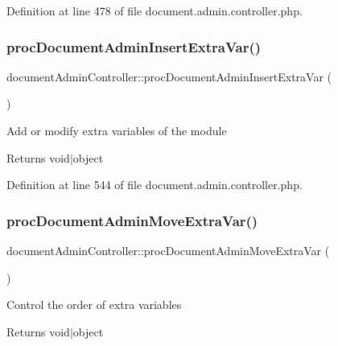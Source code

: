 Definition at line 478 of file document.\+admin.\+controller.\+php.

\hypertarget{classdocumentAdminController_a8f766283de71f7b22d325eb8dd8b4053}{}\label{classdocumentAdminController_a8f766283de71f7b22d325eb8dd8b4053} 
\subsubsection{\texorpdfstring{proc\+Document\+Admin\+Insert\+Extra\+Var()}{procDocumentAdminInsertExtraVar()}}
{\footnotesize\ttfamily document\+Admin\+Controller\+::proc\+Document\+Admin\+Insert\+Extra\+Var (\begin{DoxyParamCaption}{ }\end{DoxyParamCaption})}

Add or modify extra variables of the module \begin{DoxyReturn}{Returns}
void$\vert$object 
\end{DoxyReturn}


Definition at line 544 of file document.\+admin.\+controller.\+php.

\hypertarget{classdocumentAdminController_a037c8e048b5cd6199dd83abbfcb7b92e}{}\label{classdocumentAdminController_a037c8e048b5cd6199dd83abbfcb7b92e} 
\subsubsection{\texorpdfstring{proc\+Document\+Admin\+Move\+Extra\+Var()}{procDocumentAdminMoveExtraVar()}}
{\footnotesize\ttfamily document\+Admin\+Controller\+::proc\+Document\+Admin\+Move\+Extra\+Var (\begin{DoxyParamCaption}{ }\end{DoxyParamCaption})}

Control the order of extra variables \begin{DoxyReturn}{Returns}
void$\vert$object 
\end{DoxyReturn}



